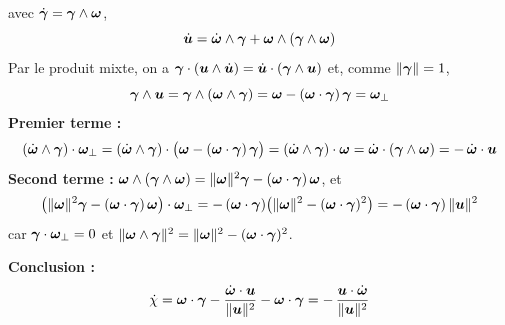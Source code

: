 \begin{demonstration}
    avec $\dot{\bm{\gamma}} = \bm{\gamma}\wedge\bm{\omega}$,
    \begin{equation*}
        \dot{\bm{u}} = \dot{\bm{\omega}}\wedge\bm{\gamma}
        + \bm{\omega}\wedge(\bm{\gamma}\wedge\bm{\omega})
    \end{equation*}
    Par le produit mixte, on a $\bm{\gamma}\cdot(\bm{u}\wedge\dot{\bm{u}}) = \dot{\bm{u}}\cdot(\bm{\gamma}\wedge\bm{u})$
    et, comme $\|\bm{\gamma}\| = 1$,
    \begin{equation*}
        \bm{\gamma}\wedge\bm{u} = \bm{\gamma}\wedge(\bm{\omega}\wedge\bm{\gamma})
        = \bm{\omega} - (\bm{\omega}\cdot\bm{\gamma})\,\bm{\gamma}
        = \bm{\omega}_\perp
    \end{equation*}
    \textbf{Premier terme : }
    \begin{equation*}
        (\dot{\bm{\omega}}\wedge\bm{\gamma})\cdot\bm{\omega}_\perp
        = (\dot{\bm{\omega}}\wedge\bm{\gamma})\cdot\big(\bm{\omega} - (\bm{\omega}\cdot\bm{\gamma})\,\bm{\gamma}\big)
        = (\dot{\bm{\omega}}\wedge\bm{\gamma})\cdot\bm{\omega}
        = \dot{\bm{\omega}}\cdot(\bm{\gamma}\wedge\bm{\omega})
        = -\,\dot{\bm{\omega}}\cdot\bm{u}
    \end{equation*}
    \textbf{Second terme : }
    $\bm{\omega}\wedge(\bm{\gamma}\wedge\bm{\omega}) = \|\bm{\omega}\|^2\bm{\gamma} - (\bm{\omega}\cdot\bm{\gamma})\,\bm{\omega}$, et
    \begin{equation*}
        \big(\|\bm{\omega}\|^2\bm{\gamma} - (\bm{\omega}\cdot\bm{\gamma})\,\bm{\omega}\big)\cdot\bm{\omega}_\perp
        = -\,(\bm{\omega}\cdot\bm{\gamma})\big(\|\bm{\omega}\|^2 - (\bm{\omega}\cdot\bm{\gamma})^2\big)
        = -\,(\bm{\omega}\cdot\bm{\gamma})\,\|\bm{u}\|^2
    \end{equation*}
    car $\bm{\gamma}\cdot\bm{\omega}_\perp = 0$ et
    $\|\bm{\omega}\wedge\bm{\gamma}\|^2 = \|\bm{\omega}\|^2 - (\bm{\omega}\cdot\bm{\gamma})^2$.

    \textbf{Conclusion : }
    \begin{equation*}
        \dot{\chi} = \bm{\omega}\cdot\bm{\gamma}
        - \frac{\dot{\bm{\omega}}\cdot\bm{u}}{\|\bm{u}\|^2}
        - \bm{\omega}\cdot\bm{\gamma}
        = -\,\frac{\bm{u}\cdot\dot{\bm{\omega}}}{\|\bm{u}\|^2}
    \end{equation*}
\end{demonstration}

